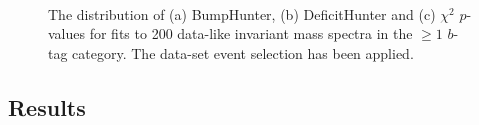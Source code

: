 \begin{figure}[!htb]
\begin{center}
  \\
  \end{center}
  \caption{The distribution of (a) BumpHunter, (b) DeficitHunter and (c) $\chi^{2}$ \mbox{$p$-value}s for fits to
    200 data-like invariant mass spectra in the $\geq1$ $b$-tag category.
    The \summer{} data-set event selection has been applied.}
  \label{fig:pValueHists_bj}
\end{figure}

\FloatBarrier

%
  
\subsection{Results}
\label{sec:bkg-summer_results}

